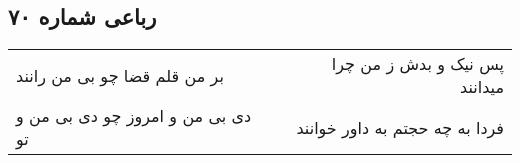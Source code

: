 \begin{center}
\section*{رباعی شماره ۷۰}
\label{sec:sh070}
\begin{longtable}{l p{0.5cm} r}
بر من قلم قضا چو بی من رانند
&&
پس نیک و بدش ز من چرا میدانند
\\
دی بی من و امروز چو دی بی من و تو
&&
فردا به چه حجتم به داور خوانند
\\
\end{longtable}
\end{center}
